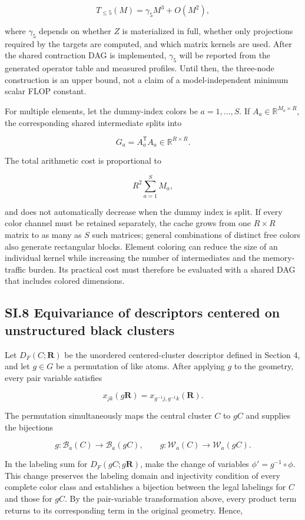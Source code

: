 \[
T_{\le5}(M)=\gamma_5M^3+O(M^2),
\]

where \(\gamma_5\) depends on whether \(Z\) is materialized in full, whether only projections required by the targets are computed, and which matrix kernels are used. After the shared contraction DAG is implemented, \(\gamma_5\) will be reported from the generated operator table and measured profiles. Until then, the three-node construction is an upper bound, not a claim of a model-independent minimum scalar FLOP constant.

For multiple elements, let the dummy-index colors be \(a=1,\ldots,S\). If \(A_a\in\mathbb R^{M_a\times R}\), the corresponding shared intermediate splits into

\[
G_a=A_a^{\mathsf T}A_a\in\mathbb R^{R\times R}.
\]

The total arithmetic cost is proportional to

\[
R^2\sum_{a=1}^{S}M_a,
\]

and does not automatically decrease when the dummy index is split. If every color channel must be retained separately, the cache grows from one \(R\times R\) matrix to as many as \(S\) such matrices; general combinations of distinct free colors also generate rectangular blocks. Element coloring can reduce the size of an individual kernel while increasing the number of intermediates and the memory-traffic burden. Its practical cost must therefore be evaluated with a shared DAG that includes colored dimensions.

\subsection{SI.8 Equivariance of descriptors centered on unstructured black clusters}\label{sec:si-equivariance}

Let \(D_F(C;\mathbf R)\) be the unordered centered-cluster descriptor defined in Section 4, and let \(g\in G\) be a permutation of like atoms. After applying \(g\) to the geometry, every pair variable satisfies

\[
x_{jk}(g\mathbf R)=x_{g^{-1}j,g^{-1}k}(\mathbf R).
\]

The permutation simultaneously maps the central cluster \(C\) to \(gC\) and supplies the bijections

\[
g:\mathcal B_a(C)\longrightarrow\mathcal B_a(gC),
\qquad
g:\mathcal W_a(C)\longrightarrow\mathcal W_a(gC).
\]

In the labeling sum for \(D_F(gC;g\mathbf R)\), make the change of variables \(\phi'=g^{-1}\circ\phi\). This change preserves the labeling domain and injectivity condition of every complete color class and establishes a bijection between the legal labelings for \(C\) and those for \(gC\). By the pair-variable transformation above, every product term returns to its corresponding term in the original geometry. Hence,

